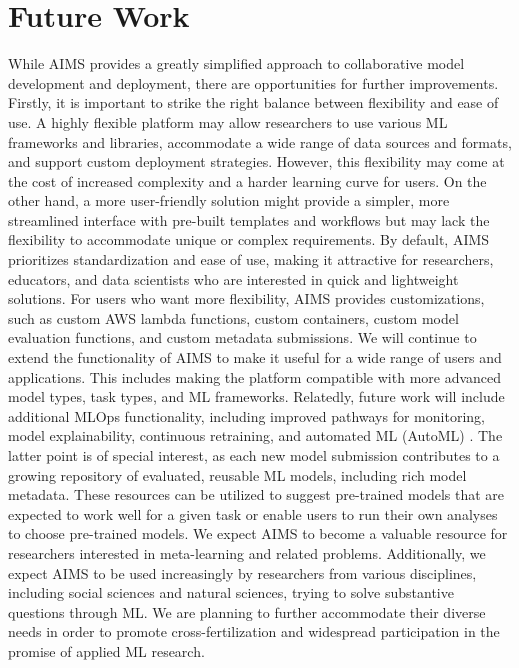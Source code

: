 \section{Future Work}
While AIMS provides a greatly simplified approach to collaborative model development and deployment, there are opportunities for further improvements. Firstly, it is important to strike the right balance between flexibility and ease of use. A highly flexible platform may allow researchers to use various ML frameworks and libraries, accommodate a wide range of data sources and formats, and support custom deployment strategies. However, this flexibility may come at the cost of increased complexity and a harder learning curve for users. On the other hand, a more user-friendly solution might provide a simpler, more streamlined interface with pre-built templates and workflows but may lack the flexibility to accommodate unique or complex requirements. By default, AIMS prioritizes standardization and ease of use, making it attractive for researchers, educators, and data scientists who are interested in quick and lightweight solutions. For users who want more flexibility, AIMS provides customizations, such as custom AWS lambda functions, custom containers, custom model evaluation functions, and custom metadata submissions. We will continue to extend the functionality of AIMS to make it useful for a wide range of users and applications. This includes making the platform compatible with more advanced model types, task types, and ML frameworks. Relatedly, future work will include additional MLOps functionality, including improved pathways for monitoring, model explainability, continuous retraining, and automated ML (AutoML) \citep{hutter_automated_2019, he_automl_2021}. The latter point is of special interest, as each new model submission contributes to a growing repository of evaluated, reusable ML models, including rich model metadata. These resources can be utilized to suggest pre-trained models that are expected to work well for a given task or enable users to run their own analyses to choose pre-trained models. We expect AIMS to become a valuable resource for researchers interested in meta-learning \citep{hospedales_meta-learning_2020, finn_model-agnostic_2017} and related problems. Additionally, we expect AIMS to be used increasingly by researchers from various disciplines, including social sciences and natural sciences, trying to solve substantive questions through ML. We are planning to further accommodate their diverse needs in order to promote cross-fertilization and widespread participation in the promise of applied ML research. 

